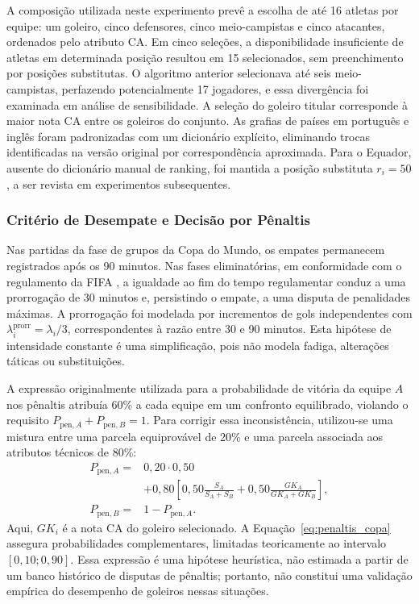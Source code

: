 \documentclass[12pt]{article}
\begin{document}
A composição utilizada neste experimento prevê a escolha de até 16 atletas por equipe: um goleiro, cinco defensores, cinco meio-campistas e cinco atacantes, ordenados pelo atributo CA. Em cinco seleções, a disponibilidade insuficiente de atletas em determinada posição resultou em 15 selecionados, sem preenchimento por posições substitutas. O algoritmo anterior selecionava até seis meio-campistas, perfazendo potencialmente 17 jogadores, e essa divergência foi examinada em análise de sensibilidade. A seleção do goleiro titular corresponde à maior nota CA entre os goleiros do conjunto. As grafias de países em português e inglês foram padronizadas com um dicionário explícito, eliminando trocas identificadas na versão original por correspondência aproximada. Para o Equador, ausente do dicionário manual de ranking, foi mantida a posição substituta $r_i=50$, a ser revista em experimentos subsequentes.

\subsubsection{Critério de Desempate e Decisão por Pênaltis}

Nas partidas da fase de grupos da Copa do Mundo, os empates permanecem registrados após os 90 minutos. Nas fases eliminatórias, em conformidade com o regulamento da FIFA \cite{fifa2026regulamento}, a igualdade ao fim do tempo regulamentar conduz a uma prorrogação de 30 minutos e, persistindo o empate, a uma disputa de penalidades máximas. A prorrogação foi modelada por incrementos de gols independentes com $\lambda_i^{\mathrm{prorr}}=\lambda_i/3$, correspondentes à razão entre 30 e 90 minutos. Esta hipótese de intensidade constante é uma simplificação, pois não modela fadiga, alterações táticas ou substituições.

A expressão originalmente utilizada para a probabilidade de vitória da equipe $A$ nos pênaltis atribuía 60\% a cada equipe em um confronto equilibrado, violando o requisito $P_{\mathrm{pen},A}+P_{\mathrm{pen},B}=1$. Para corrigir essa inconsistência, utilizou-se uma mistura entre uma parcela equiprovável de 20\% e uma parcela associada aos atributos técnicos de 80\%:
\begin{equation}
\begin{aligned}
 P_{\mathrm{pen},A}={}&0{,}20\cdot 0{,}50\\
 &+0{,}80\left[0{,}50\frac{S_A}{S_A+S_B}
 +0{,}50\frac{GK_A}{GK_A+GK_B}\right],\\
 P_{\mathrm{pen},B}={}&1-P_{\mathrm{pen},A}.
\end{aligned}
 \label{eq:penaltis_copa}
\end{equation}
Aqui, $GK_i$ é a nota CA do goleiro selecionado. A Equação~\ref{eq:penaltis_copa} assegura probabilidades complementares, limitadas teoricamente ao intervalo $[0{,}10;0{,}90]$. Essa expressão é uma hipótese heurística, não estimada a partir de um banco histórico de disputas de pênaltis; portanto, não constitui uma validação empírica do desempenho de goleiros nessas situações.
\end{document}
